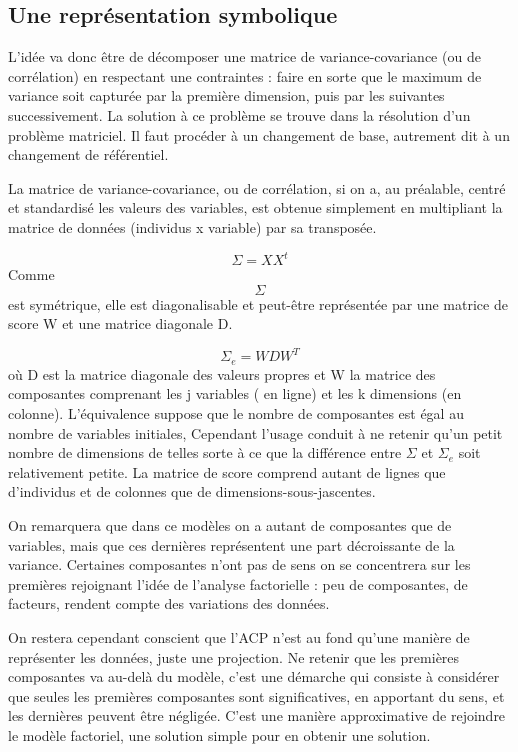 \documentclass[
]{book}
\begin{document}
\hypertarget{une-repruxe9sentation-symbolique}{%
\subsection{Une représentation symbolique}\label{une-repruxe9sentation-symbolique}}

L'idée va donc être de décomposer une matrice de variance-covariance (ou de corrélation) en respectant une contraintes : faire en sorte que le maximum de variance soit capturée par la première dimension, puis par les suivantes successivement. La solution à ce problème se trouve dans la résolution d'un problème matriciel. Il faut procéder à un changement de base, autrement dit à un changement de référentiel.

La matrice de variance-covariance, ou de corrélation, si on a, au préalable, centré et standardisé les valeurs des variables, est obtenue simplement en multipliant la matrice de données (individus x variable) par sa transposée.

\[\Sigma = XX^t\]
Comme \[\Sigma\] est symétrique, elle est diagonalisable et peut-être représentée par une matrice de score W et une matrice diagonale D.

\[\Sigma_{e} =WDW^T\]
où D est la matrice diagonale des valeurs propres et W la matrice des composantes comprenant les j variables ( en ligne) et les k dimensions (en colonne). L'équivalence suppose que le nombre de composantes est égal au nombre de variables initiales, Cependant l'usage conduit à ne retenir qu'un petit nombre de dimensions de telles sorte à ce que la différence entre \(\Sigma\) et \(\Sigma_{e}\) soit relativement petite. La matrice de score comprend autant de lignes que d'individus et de colonnes que de dimensions-sous-jascentes.

On remarquera que dans ce modèles on a autant de composantes que de variables, mais que ces dernières représentent une part décroissante de la variance. Certaines composantes n'ont pas de sens on se concentrera sur les premières rejoignant l'idée de l'analyse factorielle : peu de composantes, de facteurs, rendent compte des variations des données.

On restera cependant conscient que l'ACP n'est au fond qu'une manière de représenter les données, juste une projection. Ne retenir que les premières composantes va au-delà du modèle, c'est une démarche qui consiste à considérer que seules les premières composantes sont significatives, en apportant du sens, et les dernières peuvent être négligée. C'est une manière approximative de rejoindre le modèle factoriel, une solution simple pour en obtenir une solution.
\end{document}
